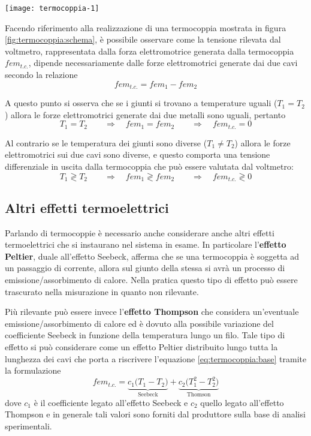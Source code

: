 	\begin{SCfigure}[0.7][bht]
		\centering
		\texttt{[image: termocoppia-1]}
		\caption{implementazione di una termocoppia.}
		\label{fig:termocoppia:schema}
	\end{SCfigure}
	
	Facendo riferimento alla realizzazione di una termocoppia mostrata in figura \ref{fig:termocoppia:schema}, è possibile osservare come la tensione rilevata dal voltmetro, rappresentata dalla forza elettromotrice generata dalla termocoppia $fem_{t.c.}$, dipende necessariamente dalle forze elettromotrici generate dai due cavi secondo la relazione
	\begin{equation} \label{eq:termocoppia:base}
		fem_{t.c.} = fem_1 - fem_2
	\end{equation}

	A questo punto si osserva che se i giunti si trovano a temperature uguali ($T_1 = T_2$) allora le forze elettromotrici generate dai due metalli sono uguali, pertanto 
	\[ T_1 = T_2 \qquad \Rightarrow \quad fem_1 = fem_2 \qquad \Rightarrow \quad fem_{t.c.} = 0  \]
	
	Al contrario se le temperatura dei giunti sono diverse ($T_1\neq T_2$) allora le forze elettromotrici sui due cavi sono diverse, e questo comporta una tensione differenziale in uscita dalla termocoppia che può essere valutata dal voltmetro:
	\[ T_1 \gtrless T_2  \qquad \Rightarrow \quad fem_1 \gtrless fem_2 \qquad \Rightarrow \quad fem_{t.c.} \gtrless 0 \]
	
	\subsection{Altri effetti termoelettrici}
		Parlando di termocoppie è necessario anche considerare anche altri effetti termoelettrici che si instaurano nel sistema in esame. In particolare l'\textbf{effetto Peltier}, duale all'effetto Seebeck, afferma che se una termocoppia è soggetta ad un passaggio di corrente, allora sul giunto della stessa si avrà un processo di emissione/assorbimento di calore. Nella pratica questo tipo di effetto può essere trascurato nella misurazione in quanto non rilevante.
		
		Più rilevante può essere invece l'\textbf{effetto Thompson} che considera un'eventuale emissione/assorbimento di calore ed è dovuto alla possibile variazione del coefficiente Seebeck in funzione della temperatura lungo un filo. Tale tipo di effetto si può considerare come un effetto Peltier distribuito lungo tutta la lunghezza dei cavi che porta a riscrivere l'equazione \ref{eq:termocoppia:base} tramite la formulazione
		\begin{equation}
			fem_{t.c.} = \underbrace{c_1 \big(T_1-T_2\big)}_\textrm{Seebeck} +\underbrace{ c_2\big(T_1^2-T_2^2\big)}_\textrm{Thomson}
		\end{equation}
		dove $c_1$ è il coefficiente legato all'effetto Seebeck e $c_2$ quello legato all'effetto Thompson e in generale tali valori sono forniti dal produttore sulla base di analisi sperimentali.


